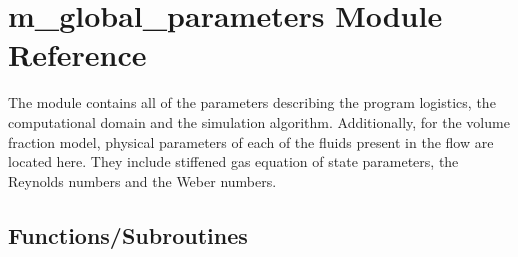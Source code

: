 \hypertarget{namespacem__global__parameters}{}\section{m\+\_\+global\+\_\+parameters Module Reference}
\label{namespacem__global__parameters}


The module contains all of the parameters describing the program logistics, the computational domain and the simulation algorithm. Additionally, for the volume fraction model, physical parameters of each of the fluids present in the flow are located here. They include stiffened gas equation of state parameters, the Reynolds numbers and the Weber numbers.  


\subsection*{Functions/\+Subroutines}
